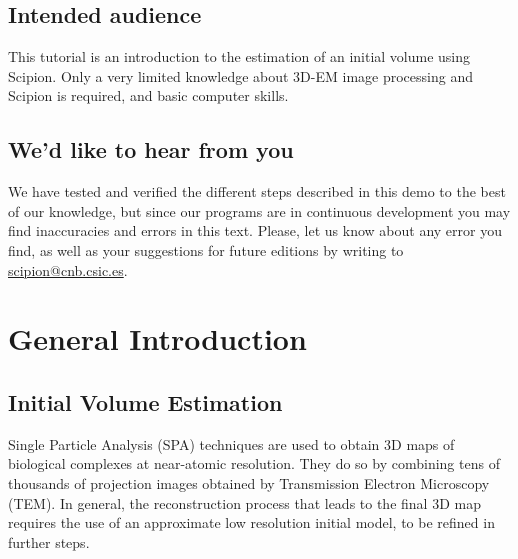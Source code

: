 \documentclass[12pt]{article} %
\begin{document}



\subsection*{Intended audience}

This tutorial is an introduction to the estimation of an initial
volume using Scipion.  Only a very limited knowledge about 3D-EM image
processing and Scipion is required, and basic computer skills.

\subsection*{We'd like to hear from you}

We have tested and verified the different steps described in this demo
to the best of our knowledge, but since our programs are in continuous
development you may find inaccuracies and errors in this text. Please,
let us know about any error you find, as well as your suggestions for
future editions by writing to
\href{mailto:scipion@cnb.csic.es}{scipion@cnb.csic.es}.

\newpage


\tableofcontents %

\newpage %


\section{General Introduction}

\subsection{Initial Volume Estimation}

Single Particle Analysis (SPA) techniques are used to obtain 3D maps
of biological complexes at near-atomic resolution. They do so by
combining tens of thousands of projection images obtained by
Transmission Electron Microscopy (TEM). In general, the reconstruction
process that leads to the final 3D map requires the use of an
approximate low resolution initial model, to be refined in further
steps.
\end{document}
